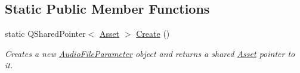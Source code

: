 \subsection*{Static Public Member Functions}
\begin{DoxyCompactItemize}
\item 
\hypertarget{class_picto_1_1_audio_file_parameter_af5c3b27e05dc3b68dfc862fad1eccda6}{static Q\-Shared\-Pointer$<$ \hyperlink{class_picto_1_1_asset}{Asset} $>$ \hyperlink{class_picto_1_1_audio_file_parameter_af5c3b27e05dc3b68dfc862fad1eccda6}{Create} ()}\label{class_picto_1_1_audio_file_parameter_af5c3b27e05dc3b68dfc862fad1eccda6}

\begin{DoxyCompactList}\small\item\em Creates a new \hyperlink{class_picto_1_1_audio_file_parameter}{Audio\-File\-Parameter} object and returns a shared \hyperlink{class_picto_1_1_asset}{Asset} pointer to it. \end{DoxyCompactList}\end{DoxyCompactItemize}
